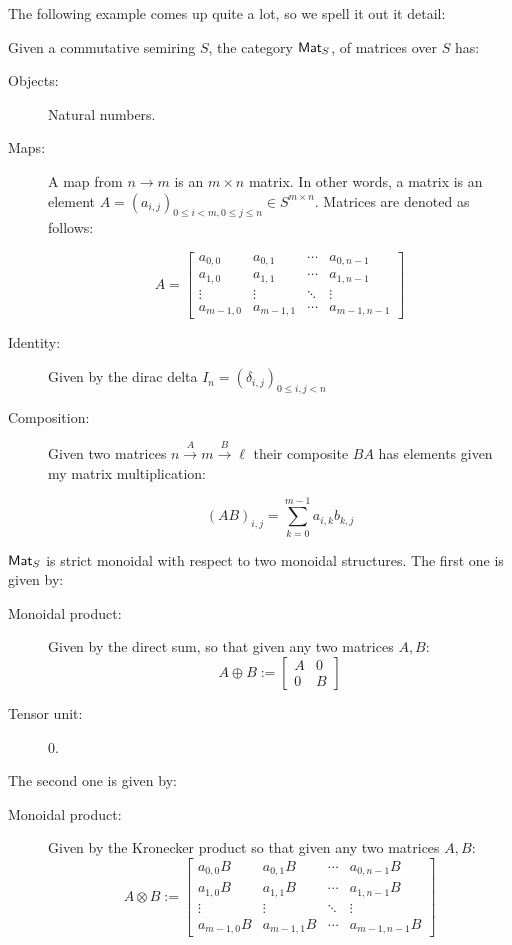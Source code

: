 The following example comes up quite a lot, so we spell it out it detail:
\begin{example}
\label{def:mat}
Given a commutative semiring $S$, the category $\mathsf{Mat}_S$, of matrices over $S$ has:

\begin{description}
\item[Objects:] Natural numbers.
\item[Maps:] A map from $n\to m$ is an $m\times n$ matrix. In other words, a matrix is an element $A=(a_{i,j})_{0\leq i< m, 0\leq j \leq n}\in S^{m\times n}$.  Matrices are denoted as follows:

$$
A =
\begin{bmatrix}
a_{0,0}     & a_{0,1}     & \cdots & a_{0,n-1}\\
a_{1,0}     & a_{1,1}     & \cdots & a_{1,n-1}\\
  \vdots      & \vdots        & \ddots & \vdots \\
a_{m-1,0} & a_{m-1,1} & \cdots  & a_{m-1,n-1}
\end{bmatrix}
$$

\item[Identity:] Given by the dirac delta $I_n=(\delta_{i,j})_{0\leq i,j< n}$

\item[Composition:] Given two matrices $n\xrightarrow{A} m \xrightarrow{B} \ell$ their composite $BA$ has elements given my matrix multiplication:

$$
(AB)_{i,j}=\sum_{k=0}^{m-1} a_{i,k} b_{k,j}
$$

\end{description}


$\mathsf{Mat}_S$ is strict monoidal with respect to two monoidal structures.  The first one is given by:

\begin{description}
\item[Monoidal product:] Given by the direct sum, so that given any two matrices  $A,B$:
$$
A \oplus B:=
\begin{bmatrix}
A & 0\\
0 & B
\end{bmatrix}
$$
\item[Tensor unit:] 0.

\end{description}



The second one is given by:

\begin{description}
\item[Monoidal product:] Given by the Kronecker product so that given any two matrices  $A,B$:
$$
A \otimes  B:=
\begin{bmatrix}
a_{0,0}B     & a_{0,1}B     & \cdots & a_{0,n-1} B\\
a_{1,0}B     & a_{1,1}B     & \cdots & a_{1,n-1} B\\
  \vdots      & \vdots            & \ddots & \vdots \\
a_{m-1,0}B & a_{m-1,1}B & \cdots  & a_{m-1,n-1} B
\end{bmatrix}
$$


\end{description}
\end{example}
